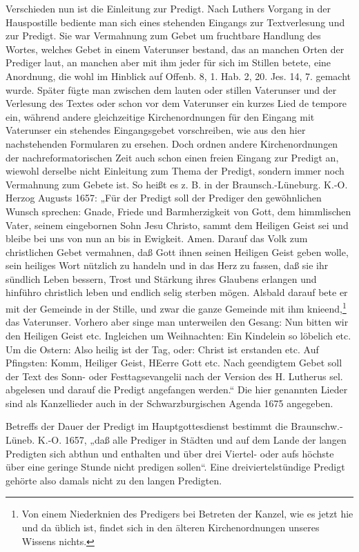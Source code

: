 Verschieden nun ist die Einleitung zur Predigt. Nach Luthers Vorgang in der Hauspostille bediente man sich eines stehenden Eingangs zur Textverlesung und zur Predigt. Sie war Vermahnung zum Gebet um fruchtbare Handlung des Wortes, welches Gebet in einem Vaterunser bestand, das an manchen Orten der Prediger laut, an manchen aber mit ihm jeder für sich im Stillen betete, eine Anordnung, die wohl im Hinblick auf Offenb. 8, 1. Hab. 2, 20. Jes. 14, 7. gemacht wurde. Später fügte man zwischen dem lauten oder stillen Vaterunser und der Verlesung des Textes oder schon vor dem Vaterunser ein kurzes Lied de tempore ein, während andere gleichzeitige Kirchenordnungen für den Eingang mit Vaterunser ein stehendes Eingangsgebet vorschreiben, wie aus den hier nachstehenden Formularen zu ersehen. Doch ordnen andere Kirchenordnungen der nachreformatorischen Zeit auch schon einen freien Eingang zur Predigt an, wiewohl derselbe nicht Einleitung zum Thema der Predigt, sondern immer noch Vermahnung zum Gebete ist. So heißt es z. B. in der Braunsch.-Lüneburg. K.-O. Herzog Augusts 1657: „Für der Predigt soll der Prediger den gewöhnlichen Wunsch sprechen: Gnade, Friede und Barmherzigkeit von Gott, dem himmlischen Vater, seinem eingebornen Sohn Jesu Christo, sammt dem Heiligen Geist sei und bleibe bei uns von nun an bis in Ewigkeit. Amen. Darauf das Volk zum christlichen Gebet vermahnen, daß Gott ihnen seinen Heiligen Geist geben wolle, sein heiliges Wort nützlich zu handeln und in das Herz zu fassen, daß sie ihr sündlich Leben bessern, Trost und Stärkung ihres Glaubens erlangen und hinführo christlich leben und endlich selig sterben mögen. Alsbald darauf bete er mit der Gemeinde in der
Stille, und zwar die ganze Gemeinde mit ihm knieend,\footnote{Von einem Niederknien des Predigers bei Betreten der Kanzel, wie es jetzt hie und da üblich ist, findet sich in den älteren Kirchenordnungen unseres Wissens nichts.} das Vaterunser. Vorhero aber singe man unterweilen den Gesang: Nun bitten wir den Heiligen Geist etc. Ingleichen um Weihnachten: Ein Kindelein so löbelich etc. Um die Ostern: Also heilig ist der Tag, oder: Christ ist erstanden etc. Auf Pfingsten: Komm, Heiliger Geist, HEerre Gott etc. Nach geendigtem Gebet soll der Text des Sonn- oder Festtagsevangelii nach der Version des H. Lutherus sel. abgelesen und darauf die Predigt angefangen werden.“ Die hier genannten Lieder sind als Kanzellieder auch in der Schwarzburgischen Agenda 1675 angegeben.

Betreffs der Dauer der Predigt im Hauptgottesdienst bestimmt die Braunschw.-Lüneb. K.-O. 1657, „daß alle Prediger in Städten und auf dem Lande der langen Predigten sich abthun und enthalten und über drei Viertel- oder aufs höchste über eine geringe Stunde nicht predigen sollen“. Eine dreiviertelstündige Predigt gehörte also damals nicht zu den langen Predigten.

